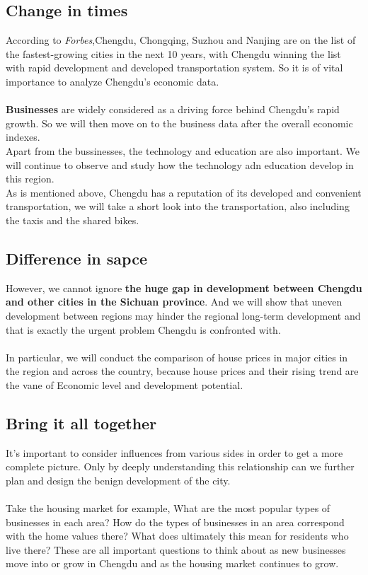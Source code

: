\documentclass{article}
\begin{document}
\subsection{Change in times}
According to \textit{Forbes},Chengdu, Chongqing, Suzhou and Nanjing are on the list of the fastest-growing cities in the next 10 years, with Chengdu winning the list with rapid development and developed transportation system. So it is of vital importance to analyze Chengdu's economic data.\\
\\
\textbf{Businesses} are widely considered as a driving force behind Chengdu's rapid growth. So we will then move on to the business data after the overall economic indexes.\\
Apart from the bussinesses, the technology and education are also important. We will continue to observe and study how the technology adn education develop in this region.\\
As is mentioned above, Chengdu has a reputation of its developed and convenient transportation, we will take a short look into the transportation, also including the taxis and the shared bikes.\\
\subsection{Difference in sapce}
However, we cannot ignore \textbf{the huge gap in development between Chengdu and other cities in the Sichuan province}. And we will show that uneven development between regions may hinder the regional long-term development and that is exactly the urgent problem Chengdu is confronted with. \\
\\
In particular, we will conduct the comparison of house prices in major cities in the region and across the country, because house prices and their rising trend are the vane of Economic level and development potential.
\\
\subsection{Bring it all together}
 It's important to consider influences from various sides in order to get a more complete picture. Only by deeply understanding this relationship can we further plan and design the benign development of the city.\\
 \\
 Take the housing market for example, What are the most popular types of businesses in each area? How do the types of businesses in an area correspond with the home values there? What does ultimately this mean for residents who live there? These are all important questions to think about as new businesses move into or grow in Chengdu and as the housing market continues to grow.
\end{document}
